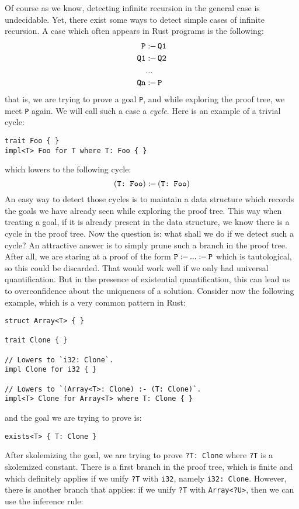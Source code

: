 \documentclass[twocolumn]{article}
\newcommand{\rust}[1]{\texttt{#1}}
\newcommand{\mrust}[1]{\text{\rust{#1}}}
\newcommand{\pif}[0]{:\!\!-\,}
\begin{document}
Of course as we know, detecting infinite recursion in the general case is undecidable. Yet, there exist some ways to detect simple cases of infinite recursion. A case which often appears in Rust programs is the following:
\[
    \begin{aligned}
    \mrust{P} &\pif \mrust{Q1} \\
    \mrust{Q1} &\pif \mrust{Q2} \\
    &... \\
    \mrust{Qn} &\pif \mrust{P}
    \end{aligned}
\]
that is, we are trying to prove a goal \rust{P}, and while exploring the proof tree, we meet \rust{P} again. We will call such a case a \textit{cycle}. Here is an example of a trivial cycle:
\begin{verbatim}
trait Foo { }
impl<T> Foo for T where T: Foo { }
\end{verbatim}
which lowers to the following cycle:
\[
    (\mrust{T: Foo}) \pif (\mrust{T: Foo})
\]
An easy way to detect those cycles is to maintain a data structure which records the goals we have already seen while exploring the proof tree. This way when treating a goal, if it is already present in the data structure, we know there is a cycle in the proof tree. Now the question is: what shall we do if we detect such a cycle? An attractive answer is to simply prune such a branch in the proof tree. After all, we are staring at a proof of the form $\mrust{P} \pif ... \pif \mrust{P}$ which is tautological, so this could be discarded. That would work well if we only had universal quantification. But in the presence of existential quantification, this can lead us to overconfidence about the uniqueness of a solution. Consider now the following example, which is a very common pattern in Rust:
\begin{verbatim}
struct Array<T> { }

trait Clone { }

// Lowers to `i32: Clone`.
impl Clone for i32 { }

// Lowers to `(Array<T>: Clone) :- (T: Clone)`.
impl<T> Clone for Array<T> where T: Clone { }
\end{verbatim}
and the goal we are trying to prove is:
\begin{verbatim}
exists<T> { T: Clone }
\end{verbatim}
After skolemizing the goal, we are trying to prove \rust{?T: Clone} where \rust{?T} is a skolemized constant. There is a first branch in the proof tree, which is finite and which definitely applies if we unify \rust{?T} with \rust{i32}, namely \rust{i32: Clone}. However, there is another branch that applies: if we unify \rust{?T} with \rust{Array<?U>}, then we can use the inference rule: 
\end{document}
